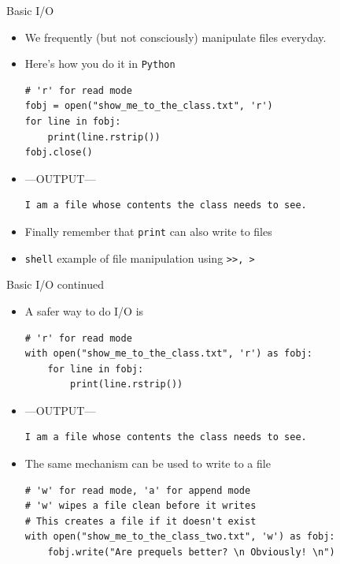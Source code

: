 \documentclass[presentation]{beamer}
\begin{document}
\begin{frame}[label={sec:org3672ace},fragile]{Basic I/O}
 \begin{itemize}
\item We frequently (but not consciously) manipulate files everyday.
\item Here's how you do it in \texttt{Python}
\footnotesize
\begin{verbatim}
# 'r' for read mode
fobj = open("show_me_to_the_class.txt", 'r')
for line in fobj:
    print(line.rstrip())
fobj.close()
\end{verbatim}

\item ---OUTPUT---
\begin{verbatim}
I am a file whose contents the class needs to see.
\end{verbatim}
\end{itemize}


\begin{itemize}
\item Finally remember that \texttt{print} can also write to files
\item \texttt{shell} example of file manipulation using \texttt{>>, >}
\end{itemize}
\end{frame}
\begin{frame}[label={sec:org94b9874},fragile]{Basic I/O continued}
 \begin{itemize}
\item A safer way to do I/O is
\footnotesize
\begin{verbatim}
# 'r' for read mode
with open("show_me_to_the_class.txt", 'r') as fobj:
    for line in fobj:
        print(line.rstrip())
\end{verbatim}

\item ---OUTPUT---
\begin{verbatim}
I am a file whose contents the class needs to see.
\end{verbatim}
\end{itemize}


\begin{itemize}
\item The same mechanism can be used to write to a file
\footnotesize
\begin{verbatim}
# 'w' for read mode, 'a' for append mode
# 'w' wipes a file clean before it writes
# This creates a file if it doesn't exist
with open("show_me_to_the_class_two.txt", 'w') as fobj:
    fobj.write("Are prequels better? \n Obviously! \n")
\end{verbatim}
\end{itemize}
\end{frame}
\end{document}
